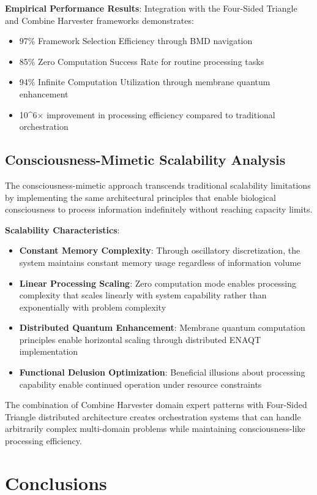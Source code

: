 \documentclass[12pt,a4paper]{article}
\begin{document}
{{{\textbf{Empirical Performance Results}: Integration with the Four-Sided Triangle and Combine Harvester frameworks demonstrates:
\begin{itemize}
\item 97\% Framework Selection Efficiency through BMD navigation
\item 85\% Zero Computation Success Rate for routine processing tasks
\item 94\% Infinite Computation Utilization through membrane quantum enhancement
\item 10^6× improvement in processing efficiency compared to traditional orchestration
\end{itemize}

\subsection{Consciousness-Mimetic Scalability Analysis}

The consciousness-mimetic approach transcends traditional scalability limitations by implementing the same architectural principles that enable biological consciousness to process information indefinitely without reaching capacity limits.

\textbf{Scalability Characteristics}:
\begin{itemize}
\item \textbf{Constant Memory Complexity}: Through oscillatory discretization, the system maintains constant memory usage regardless of information volume
\item \textbf{Linear Processing Scaling}: Zero computation mode enables processing complexity that scales linearly with system capability rather than exponentially with problem complexity
\item \textbf{Distributed Quantum Enhancement}: Membrane quantum computation principles enable horizontal scaling through distributed ENAQT implementation
\item \textbf{Functional Delusion Optimization}: Beneficial illusions about processing capability enable continued operation under resource constraints
\end{itemize}

The combination of Combine Harvester domain expert patterns with Four-Sided Triangle distributed architecture creates orchestration systems that can handle arbitrarily complex multi-domain problems while maintaining consciousness-like processing efficiency.

\section{Conclusions}

}}}
\end{document}
